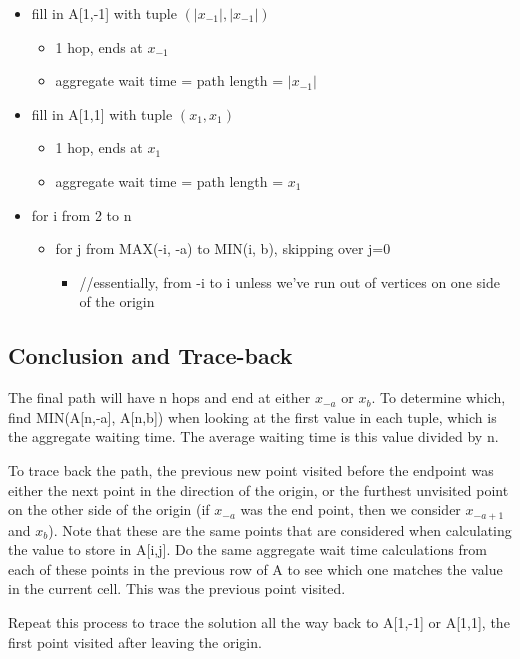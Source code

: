 \documentclass[a4paper]{article}
\begin{document}
\begin{itemize}
    \item fill in A[1,-1] with tuple $(\lvert x_{-1} \rvert, \lvert x_{-1} \rvert)$
    \begin{itemize}
        \item 1 hop, ends at $x_{-1}$
        \item aggregate wait time = path length = $\lvert x_{-1} \rvert$
    \end{itemize}
    \item fill in A[1,1] with tuple $(x_{1}, x_{1})$
    \begin{itemize}
        \item 1 hop, ends at $x_1$
        \item aggregate wait time = path length = $x_1$
    \end{itemize}
\end{itemize}

\begin{itemize}


    \item for i from 2 to n
    \begin{itemize}
        \item for j from MAX(-i, -a) to MIN(i, b), skipping over j=0
        \begin{itemize}
            \item //essentially, from -i to i unless we've run out of vertices on one side of the origin
        \end{itemize}
    \end{itemize}
\end{itemize}

\subsection{Conclusion and Trace-back}
The final path will have n hops and end at either $x_{-a}$ or $x_b$. To determine which, find MIN(A[n,-a], A[n,b]) when looking at the first value in each tuple, which is the aggregate waiting time. The average waiting time is this value divided by n.

To trace back the path, the previous new point visited before the endpoint was either the next point in the direction of the origin, or the furthest unvisited point on the other side of the origin (if $x_{-a}$ was the end point, then we consider $x_{-a+1}$ and $x_b$). Note that these are the same points that are considered when calculating the value to store in A[i,j]. Do the same aggregate wait time calculations from each of these points in the previous row of A to see which one matches the value in the current cell. This was the previous point visited.

Repeat this process to trace the solution all the way back to A[1,-1] or A[1,1], the first point visited after leaving the origin. 
\end{document}
